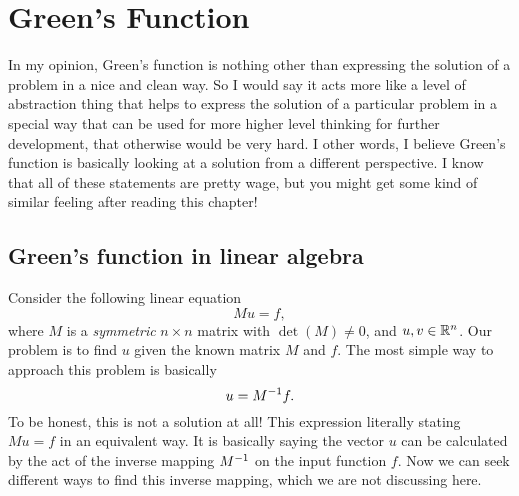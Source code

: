 \chapter{Green's Function}


In my opinion, Green's function is nothing other than expressing the solution of a problem in a nice and clean way. So I would say it acts more like a level of abstraction thing that helps to express the solution of a particular problem in a special way that can be used for more higher level thinking for further development, that otherwise would be very hard. I other words, I believe Green's function is basically looking at a solution from a different perspective. I know that all of these statements are pretty wage, but you might get some kind of similar feeling after reading this chapter!


\section{Green's function in linear algebra}
Consider the following linear equation
\[ Mu = f, \]
where $M$ is a \emph{symmetric} $n\times n$ matrix with $\det(M) \neq 0$, and $u,v \in \mathbb{R}^n$. Our problem is to find $u$ given the known matrix $M$ and $f$. The most simple way to approach this problem is basically 
\[ u = M^{-1}f. \]
To be honest, this is not a solution at all! This expression literally stating $Mu=f$ in an equivalent way. It is basically saying the vector $u$ can be calculated by the act of the inverse mapping $M^{-1}$ on the input function $f$. Now we can seek different ways to find this inverse mapping, which we are not discussing here. 

